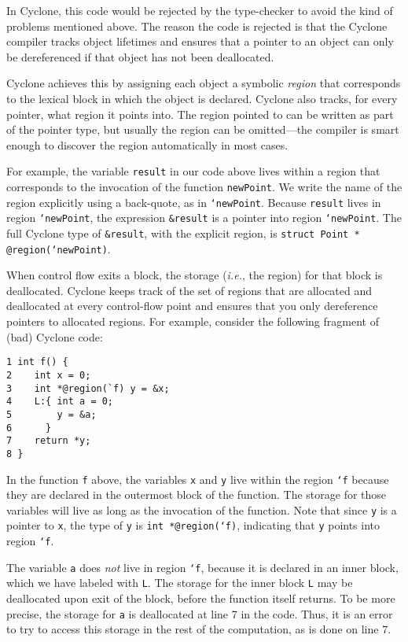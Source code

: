 In Cyclone, this code would be rejected by the type-checker to avoid
the kind of problems mentioned above.  The reason the code is rejected
is that the Cyclone compiler tracks object lifetimes and ensures that
a pointer to an object can only be dereferenced if that object 
has not been deallocated.  

Cyclone achieves this by assigning each object a symbolic
\emph{region} that corresponds to the lexical block in which the
object is declared.  Cyclone also tracks, for every pointer, what
region it points into.  The region pointed to can be written as part
of the pointer type, but usually the region can be omitted---the
compiler is smart enough to discover the region automatically in most
cases.

For example, the variable \texttt{result} in our code above lives
within a region that corresponds to the invocation of the function
\texttt{newPoint}.  We write the name of the region explicitly using a
back-quote, as in \texttt{`newPoint}.  Because \texttt{result} lives
in region \texttt{`newPoint}, the expression \texttt{\&result} is a
pointer into region \texttt{`newPoint}.  The full Cyclone type of
\texttt{\&result}, with the explicit region, is \texttt{struct Point
* @region(`newPoint)}.

When control flow exits a block, the storage (\emph{i.e.}, 
the region) for that 
block is deallocated.  Cyclone keeps track of the set of regions that
are allocated and deallocated at every control-flow point and ensures
that you only dereference pointers to allocated regions.  For example,
consider the following fragment of (bad) Cyclone code:
\begin{verbatim}
1 int f() {
2    int x = 0;
3    int *@region(`f) y = &x;
4    L:{ int a = 0;
5        y = &a;
6      }
7    return *y;
8 }
\end{verbatim}
In the function \texttt{f} above, the variables \texttt{x} and 
\texttt{y} live within the region \texttt{`f} because they are
declared in the outermost block of the function.  The storage for
those variables will live as long as the invocation of the function.
Note that since \texttt{y} is a pointer to \texttt{x}, the type of
\texttt{y} is \texttt{int *@region(`f)}, indicating that \texttt{y} 
points into region \texttt{`f}.

The variable \texttt{a} does \emph{not} live in region \texttt{`f},
because it is declared in an inner block, which we have labeled with
\texttt{L}.  The storage for the inner block \texttt{L} may be
deallocated upon exit of the block, before the function itself
returns.  To be more precise, the storage for \texttt{a} is
deallocated at line 7 in the code.  Thus, it is an error to try to
access this storage in the rest of the computation, as is done on line
7.


